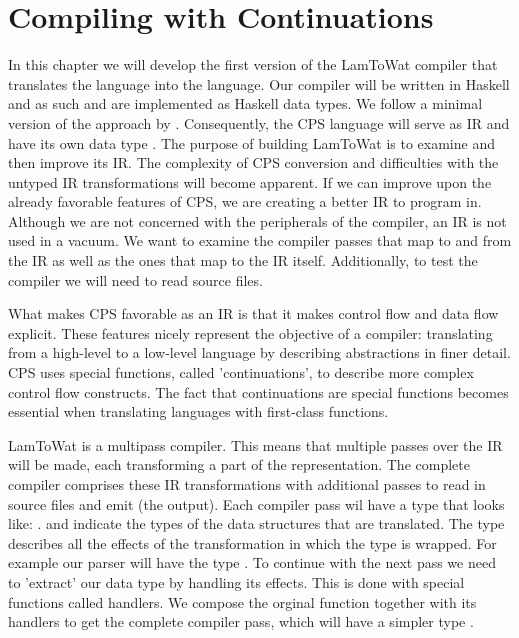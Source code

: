 
\chapter{\label{chap:cpscomp}Compiling with Continuations}

In this chapter we will develop the first version of the LamToWat compiler that translates the  language into the  language. Our compiler will be written in Haskell \autocite{haskellhomepage} and as such  and  are implemented as Haskell data types. We follow a minimal version of the approach by \citeauthor{DBLP:books/daglib/0022396} \autocite{DBLP:books/daglib/0022396}. Consequently, the CPS language will serve as IR and have its own data type . The purpose of building LamToWat is to examine and then improve its IR. The complexity of CPS conversion and difficulties with the untyped IR transformations will become apparent. If we can improve upon the already favorable features of CPS, we are creating a better IR to program in. Although we are not concerned with the peripherals of the compiler, an IR is not used in a vacuum. We want to examine the compiler passes that map to and from the IR as well as the ones that map to the IR itself. Additionally, to test the compiler we will need to read source files.

What makes CPS favorable as an IR is that it makes control flow and data flow explicit. These features nicely represent the objective of a compiler: translating from a high-level to a low-level language by describing abstractions in finer detail. CPS uses special functions, called 'continuations', to describe more complex control flow constructs. The fact that continuations are special functions becomes essential when translating languages with first-class functions.

LamToWat is a multipass compiler. This means that multiple passes over the IR will be made, each transforming a part of the representation. The complete compiler comprises these IR transformations with additional passes to read in source files and emit  (the output). Each compiler pass wil have a type that looks like: .  and  indicate the types of the data structures that are translated. The  type describes all the effects of the transformation in which the  type is wrapped. For example our  parser will have the type . To continue with the next pass we need to 'extract' our data type by handling its effects. This is done with special functions called handlers. We compose the orginal function together with its handlers to get the complete compiler pass, which will have a simpler type .

